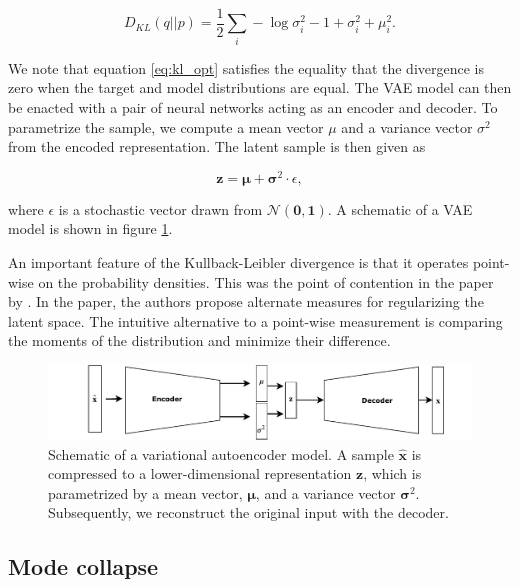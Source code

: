 \begin{equation}\label{eq:kl_opt}
D_{KL}(q||p) = \frac{1}{2} \sum_i -\log \sigma_i^2 - 1 + \sigma^2_i + \mu_i^2 .
\end{equation}

\noindent We note that equation \ref{eq:kl_opt} satisfies the equality that the divergence is zero when the target and model distributions are equal. The VAE model can then be enacted with a pair of neural networks acting as an encoder and decoder. To parametrize the sample, we compute a mean vector $\mu$ and a variance vector $\sigma^2$ from the encoded representation. The latent sample is then given as 

\begin{equation}
\mathbf{z} = \mathbf{\mu} + \mathbf{\sigma}^2 \cdot \epsilon,
\end{equation} 

\noindent where $\epsilon$ is a stochastic vector drawn from $\mathcal{N}(\mathbf{0}, \mathbf{1})$. A schematic of a VAE model is shown in figure \ref{fig:var_autoencoder}.

An important feature of the Kullback-Leibler divergence is that it operates point-wise on the probability densities. This was the point of contention in the paper by \citet{Zhao}. In the paper, the authors propose alternate measures for regularizing the latent space. The intuitive alternative to a point-wise measurement is comparing the moments of the distribution and minimize their difference. 


\begin{figure}[tb]
	\centering
	\includegraphics[width=\textwidth]{plots/variational_autoenc.pdf}
	\caption[Variational autoencoder schematic]{Schematic of a variational autoencoder model. A sample $\hat{\mathbf{x}}$ is compressed to a lower-dimensional representation $\mathbf{z}$, which is parametrized by a mean vector, $\mathbf{\mu}$, and a variance vector $\mathbf{\sigma}^2$. Subsequently, we reconstruct the original input with the decoder.}
	\label{fig:var_autoencoder}
\end{figure}


\subsection{Mode collapse}\label{sec:mode_collapse}

